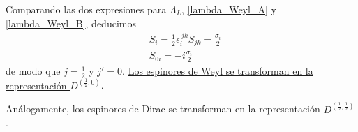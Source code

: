 Comparando las dos  expresiones para $\Lambda_L$, \eqref{lambda_Weyl_A} y \eqref{lambda_Weyl_B}, deducimos
\begin{subequations}
\begin{flalign}
&S_i=\frac{1}{2}\epsilon_i^{\ jk} S_{jk}=\frac{\sigma_i}{2}\\
&S_{0i}=-i\frac{\sigma_i}{2}
\end{flalign}
\end{subequations}
de modo que $j=\frac{1}{2}$ y $j'=0$. \underline{Los espinores de Weyl se transforman en la representación $D^{\left(\frac{1}{2},0\right)}$}.\medskip

Análogamente, los espinores de Dirac se transforman en la representación $D^{\left(\frac{1}{2},\frac{1}{2}\right)}$.

